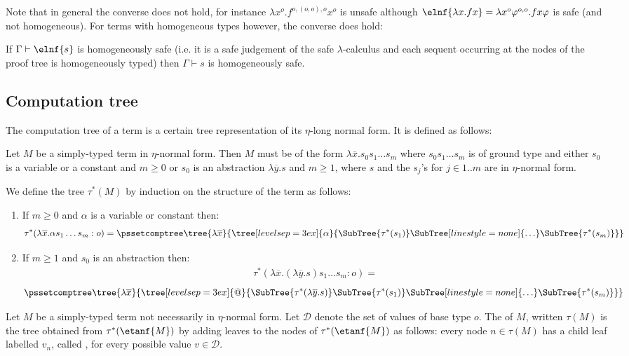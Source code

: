 Note that in general the converse does not hold, for instance $\lambda x^o . f^{o,(o,o),o} x^o$ is unsafe although $\elnf{\lambda x . f x} = \lambda x^o \varphi^{o,o} . f x \varphi$ is safe (and not homogeneous). For terms with homogeneous types however, the converse does hold:
\begin{lemma}
If $\Gamma \vdash \elnf{s}$ is homogeneously safe (i.e. it is a safe judgement of the safe $\lambda$-calculus and each sequent occurring at the nodes of the proof tree is homogeneously typed) then
$\Gamma \vdash s$ is homogeneously safe.
\end{lemma}


\subsection{Computation tree}
The computation tree of a term is a certain tree representation of its
$\eta$-long normal form. It is defined as follows:

\begin{definition}
\label{dfn:comptree} Let $M$ be a simply-typed term in $\eta$-normal
form. Then $M$ must be of the form $\lambda \overline{x} . s_0 s_1
\ldots s_m$ where $s_0 s_1 \ldots s_m$ is of ground type and either
$s_0$ is a variable or a constant and $m\geq0$ or $s_0$ is an
abstraction $\lambda\overline{y}.s$ and $m\geq1$, where $s$ and the
$s_j$'s for $j\in 1..m$ are in $\eta$-normal form.

We define the tree $\tau^*(M)$ by induction on the structure of the
term as follows:
\begin{enumerate}[-]
\item If $m\geq0$ and $\alpha$ is a variable or constant then:
$$ \tau^*( \lambda\overline{x} . \alpha s_1 \ldots s_m : o) =
    \pssetcomptree
    \tree{\lambda\overline{x}}
    {
        \tree[levelsep=3ex]{ \alpha }
            { \SubTree{\tau^*(s_1)} \SubTree[linestyle=none]{\ldots} \SubTree{\tau^*(s_m)}
            }
    }
$$

\item If $m \geq 1$ and $s_0$ is an abstraction then:
\begin{align*}
 \tau^*(\lambda\overline{x} . (\lambda\overline{y}.s) s_1 \ldots s_m : o)=
\end{align*}
$$\pssetcomptree\tree{\lambda\overline{x}} { \tree[levelsep=3ex]{
        @ } { \SubTree{\tau^*(\lambda\overline{y}.s)}
            \SubTree{\tau^*(s_1)}
            \SubTree[linestyle=none]{\ldots}
            \SubTree{\tau^*(s_m)} }}$$
\end{enumerate}

Let $M$ be a simply-typed term not necessarily in $\eta$-normal
form. Let $\mathcal{D}$ denote the set of values of base type $o$.
The  of $M$, written $\tau(M)$ is the tree
obtained from $\tau^*(\etanf{M})$ by adding leaves to the nodes of
$\tau^*(\etanf{M})$ as follows: every node $n \in \tau(M)$ has a
child leaf labelled $v_n$, called , for every
possible value $v \in \mathcal{D}$.
\end{definition}


